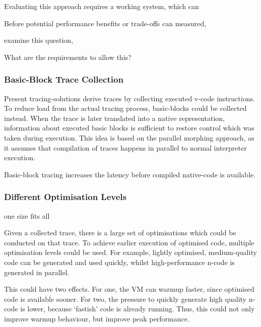 Evaluating this approach requires a working system, which can 

Before potential performance benefits or trade-offs can measured, 



examine this question, 

What are the requirements to allow this?


\subsubsection{Basic-Block Trace Collection} Present tracing-solutions derive
traces by collecting executed v-code instructions. To reduce load from the
actual tracing process, basic-blocks could be collected instead. When the trace
is later translated into a native representation, information about executed
basic blocks is sufficient to restore control which was taken during execution.
This idea is based on the parallel morphing approach, as it assumes that
compilation of traces happens in parallel to normal interpreter execution.

Basic-block tracing increases the latency before compiled native-code is
available.


\subsubsection{Different Optimisation Levels}

one size fits all


Given a collected trace, there is a large set of optimisations which could be
conducted on that trace. To achieve earlier execution of
optimised code, multiple optimisation levels could be used. For example,
lightly optimised, medium-quality code can be generated and used quickly, whilst
high-performance n-code is generated in parallel.

This could have two effects. For one, the VM can warmup faster, since optimised
code is available sooner. For two, the pressure to quickly generate high quality
n-code is lower, because `fastish' code is already running. Thus, this could not
only improve warmup behaviour, but improve peak performance.



